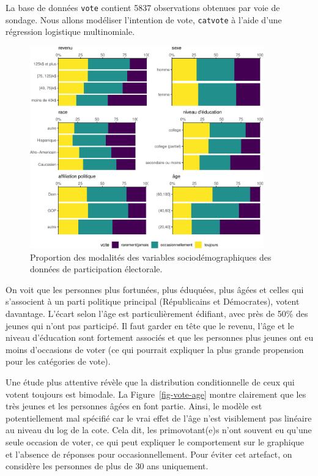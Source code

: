 \documentclass[
  11pt,
  letterpaper,
]{book}
\theoremstyle{definition}
\theoremstyle{remark}
\begin{document}
La base de données \texttt{vote} contient 5837 observations obtenues par
voie de sondage. Nous allons modéliser l'intention de vote,
\texttt{catvote} à l'aide d'une régression logistique multinomiale.

\begin{figure}[ht!]

{\centering \includegraphics[width=0.9\textwidth,height=\textheight]{./05-reglogistique_files/figure-pdf/fig-multinom_means-Ipsos-1.pdf}

}

\caption{\label{fig-multinom_means-Ipsos}Proportion des modalités des
variables sociodémographiques des données de participation électorale.}

\end{figure}

On voit que les personnes plus fortunées, plus éduquées, plus âgées et
celles qui s'associent à un parti politique principal (Républicains et
Démocrates), votent davantage. L'écart selon l'âge est particulièrement
édifiant, avec près de 50\% des jeunes qui n'ont pas participé. Il faut
garder en tête que le revenu, l'âge et le niveau d'éducation sont
fortement associés et que les personnes plus jeunes ont eu moins
d'occasions de voter (ce qui pourrait expliquer la plus grande
propension pour les catégories de vote).

Une étude plus attentive révèle que la distribution conditionnelle de
ceux qui votent toujours est bimodale. La Figure~\ref{fig-vote-age}
montre clairement que les très jeunes et les personnes âgées en font
partie. Ainsi, le modèle est potentiellement mal spécifié car le vrai
effet de l'âge n'est visiblement pas linéaire au niveau du log de la
cote. Cela dit, les primovotant(e)s n'ont souvent eu qu'une seule
occasion de voter, ce qui peut expliquer le comportement sur le
graphique et l'absence de réponses pour occasionnellement. Pour éviter
cet artefact, on considère les personnes de plus de 30 ans uniquement.
\end{document}
